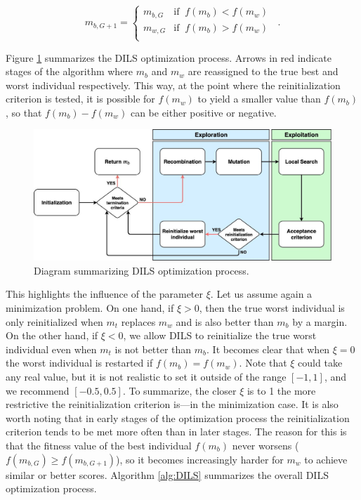 \begin{equation}
m_{b,G+1} = \left\{ \begin{array}{lc}
m_{b,G} &  \text{if} \;\; f(m_b) < f(m_w) \;\;\\
m_{w,G} &  \text{if} \;\; f(m_b) > f(m_w) \;\;\\
\end{array}
\right..
\label{eq5.2}
\end{equation}

Figure \ref{img:DILS_diag} summarizes the DILS optimization process. Arrows in red indicate stages of the algorithm where $m_b$ and $m_w$ are reassigned to the true best and worst individual respectively. This way, at the point where the reinitialization criterion is tested, it is possible for $f(m_w)$ to yield a smaller value than $f(m_b)$, so that $f(m_b) - f(m_w)$ can be either positive or negative. 

\begin{figure}[!h]
	\centering
	\includegraphics[scale=0.25]{gfx/NewProp/DILS/DILSDiagram.jpg}
	\caption{Diagram summarizing DILS optimization process.}\label{img:DILS_diag}
\end{figure}

This highlights the influence of the parameter $\xi$. Let us assume again a minimization problem. On one hand, if $\xi > 0$, then the true worst individual is only reinitialized when $m_t$ replaces $m_w$ and is also better than $m_b$ by a margin. On the other hand, if $\xi < 0$, we allow DILS to reinitialize the true worst individual even when $m_t$ is not better than $m_b$. It becomes clear that when $\xi = 0$ the worst individual is restarted if $f(m_b) = f(m_w)$. Note that $\xi$ could take any real value, but it is not realistic to set it outside of the range $[-1,1]$, and we recommend $[-0.5, 0.5]$. To summarize, the closer $\xi$ is to 1 the more restrictive the reinitialization criterion is---in the minimization case. It is also worth noting that in early stages of the optimization process the reinitialization criterion tends to be met more often than in later stages. The reason for this is that the fitness value of the best individual $f(m_b)$ never worsens ($f(m_{b,G}) \ge f(m_{b,G+1})$), so it becomes increasingly harder for $m_w$ to achieve similar or better scores. Algorithm \ref{alg:DILS} summarizes the overall DILS optimization process.

